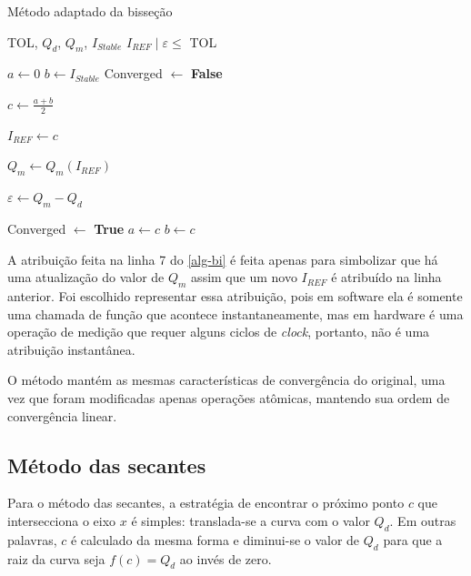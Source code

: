 \begin{algorithm}[H]
\caption{Método adaptado da bisseção}
\begin{algorithmic}[1]

\Require TOL, $Q_{d}$, $Q_{m}$, $I_{Stable}$
\Ensure $I_{REF} \; | \; \varepsilon \leq$ TOL

\State $a \gets 0$
\State $b \gets I_{Stable}$
\State Converged $\gets$ \textbf{False}
 

    \State $c \gets \frac{a+b}{2}$

    \State $I_{REF} \gets c$ 

    \State $Q_{m} \gets Q_{m}\left(I_{REF}\right)$ 

    \State $\varepsilon \gets Q_m - Q_d $

     Converged $\gets$ \textbf{True} 
        \Else
                \State $a \gets c$
            \EndIf
                \State $b \gets c$
            \EndIf
    \EndIf

\EndWhile
\end{algorithmic}
\label{alg-bi}
\end{algorithm}

A atribuição feita na linha 7 do \autoref{alg-bi} é feita apenas para simbolizar que há uma atualização do valor de $Q_m$ assim que um novo $I_{REF}$ é atribuído na linha anterior. Foi escolhido representar essa atribuição, pois em software ela é somente uma chamada de função que acontece instantaneamente, mas em hardware é uma operação de medição que requer alguns ciclos de \textit{clock}, portanto, não é uma atribuição instantânea.

O método mantém as mesmas características de convergência do original, uma vez que foram modificadas apenas operações atômicas, mantendo sua ordem de convergência linear.

\subsection{Método das secantes}\label{ss-adapt-sec}

Para o método das secantes, a estratégia de encontrar o próximo ponto $c$ que intersecciona o eixo $x$ é simples: translada-se a curva com o valor $Q_d$. Em outras palavras, $c$ é calculado da mesma forma e diminui-se o valor de $Q_d$ para que a raiz da curva seja $f(c) = Q_d$ ao invés de zero. 


